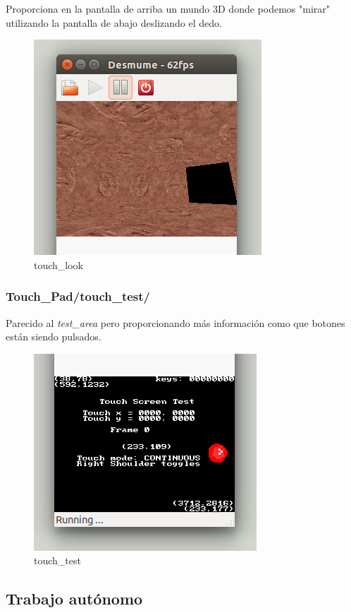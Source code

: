 Proporciona en la pantalla de arriba un mundo 3D donde podemos "mirar" utilizando la pantalla de abajo deslizando el dedo.

\begin{figure}[H] 
\centering
\includegraphics[scale=0.75]{P2Media/touch_look.png}
\caption{touch\_look}
\end{figure}

\subsubsection{Touch\_Pad/touch\_test/}

Parecido al \emph{test\_area} pero proporcionando más información como que botones están siendo pulsados.

\begin{figure}[H] 
\centering
\includegraphics[scale=0.5]{P2Media/touch_test.png}
\caption{touch\_test}
\end{figure}

\subsection{Trabajo autónomo}


